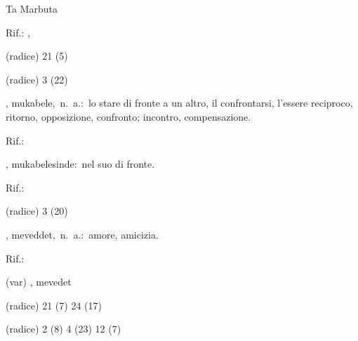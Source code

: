 \begin{glossario}{Ta Marbuta}
\begin{subvocedue}
\begin{subvocedue}
\item[Rif.:] , 
\end{subvocedue}
\item[(radice)]   21 (5)
\item[(radice)]   3 (22)
\end{subvocedue}
\item[{\color{colorlowref}\spzrl{muqAbal:H}},] {\sf mukabele},\ n.\ a.:\ lo stare  di fronte a  un altro, il confrontarsi, l'essere reciproco, ritorno, opposizione, confronto; incontro, compensazione.
\begin{subvocedue}
\item[Rif.:] 
\end{subvocedue}
\begin{subvocedue}
\item[\subglossariobullet] , {\sf mukabelesinde}:\ nel suo di fronte.
\begin{subvocedue}
\item[Rif.:] 
\end{subvocedue}
\item[(radice)]   3 (20)
\end{subvocedue}
\item[{\color{colorlowref}\spzrl{mawadda_T}},] {\sf meveddet},\ n.\ a.:\ amore, amicizia.
\begin{subvocedue}
\item[Rif.:] 
\end{subvocedue}
\begin{subvocedue}
\item[(var)] , {\sf mevedet}\item[(radice)]   21 (7) 24 (17)
\item[(radice)]   2 (8) 4 (23) 12 (7)
\end{subvocedue}



\end{glossario}
